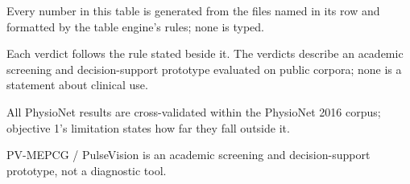 \begin{table}[htbp]
\begin{tabular}{lrrrrrrr}
    \bottomrule
  \end{tabular}
  \par\footnotesize Every number in this table is generated from the files named in its row and formatted by the table engine's rules; none is typed.
  \par\footnotesize Each verdict follows the rule stated beside it. The verdicts describe an academic screening and decision-support prototype evaluated on public corpora; none is a statement about clinical use.
  \par\footnotesize All PhysioNet results are cross-validated within the PhysioNet 2016 corpus; objective 1's limitation states how far they fall outside it.
  \par\footnotesize PV-MEPCG / PulseVision is an academic screening and decision-support prototype, not a diagnostic tool.
\end{table}
